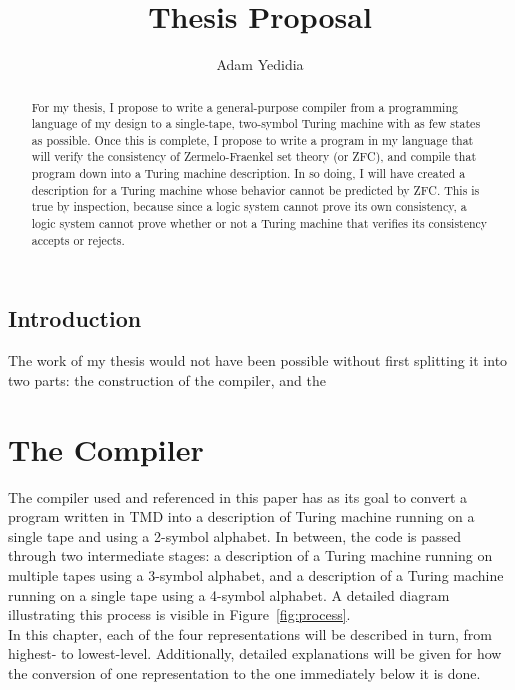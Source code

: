 \documentclass{report}
\begin{document}
\title{Thesis Proposal}
\author{Adam Yedidia}

\maketitle

\begin{abstract}
For my thesis, I propose to write a general-purpose compiler from a programming language of my design to a single-tape, two-symbol Turing machine with as few states as possible. Once this is complete, I propose to write a program in my language that will verify the consistency of Zermelo-Fraenkel set theory (or ZFC), and compile that program down into a Turing machine description. In so doing, I will have created a description for a Turing machine whose behavior cannot be predicted by ZFC. This is true by inspection, because since a logic system cannot prove its own consistency, a logic system cannot prove whether or not a Turing machine that verifies its consistency accepts or rejects.
\end{abstract}

\section{Introduction}
The work of my thesis would not have been possible without first splitting it into two parts: the construction of the compiler, and the 

\chapter{The Compiler}

The compiler used and referenced in this paper has as its goal to convert a program written in TMD into a description of Turing machine running on a single tape and using a 2-symbol alphabet. In between, the code is passed through two intermediate stages: a description of a Turing machine running on multiple tapes using a 3-symbol alphabet, and a description of a Turing machine running on a single tape using a 4-symbol alphabet. A detailed diagram illustrating this process is visible in Figure~\ref{fig:process}. \\

In this chapter, each of the four representations will be described in turn, from highest- to lowest-level. Additionally, detailed explanations will be given for how the conversion of one representation to the one immediately below it is done.
\end{document}
